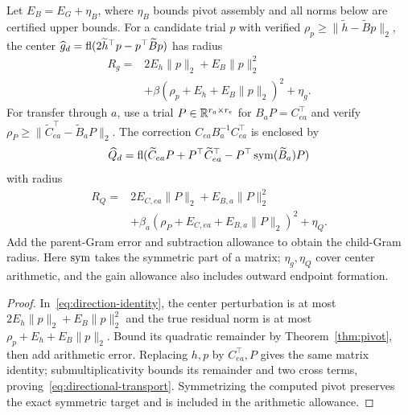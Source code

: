 \begin{theorem}\label{thm:directional}
Let $E_B=E_G+\eta_B$, where $\eta_B$ bounds pivot assembly and all norms below are certified upper bounds. For a candidate trial $p$ with verified $\rho_p\ge\|\widetilde h-\widetilde Bp\|_2$, the center $\widehat g_d=\operatorname{fl}(2\widetilde h^\top p-p^\top\widetilde Bp)$ has radius
\begin{equation}
 \begin{aligned}
 R_g={}&2E_h\|p\|_2+E_B\|p\|_2^2\\
 &+\beta(\rho_p+E_h+E_B\|p\|_2)^2+\eta_g.
 \end{aligned}
 \label{eq:directional-score}
\end{equation}
For transfer through $a$, use a trial $P\in\mathbb R^{r_a\times r_e}$ for $B_aP=C_{ea}^\top$ and verify $\rho_P\ge\|\widetilde C_{ea}^\top-\widetilde B_aP\|_2$. The correction $C_{ea}B_a^{-1}C_{ea}^\top$ is enclosed by
\begin{equation}
 \widehat Q_d=\operatorname{fl}(\widetilde C_{ea}P+P^\top\widetilde C_{ea}^\top
                         -P^\top\operatorname{sym}(\widetilde B_a)P)
 \label{eq:directional-center}
\end{equation}
with radius
\begin{equation}
 \begin{aligned}
 R_Q={}&2E_{C,ea}\|P\|_2+E_{B,a}\|P\|_2^2\\
 &+\beta_a(\rho_P+E_{C,ea}+E_{B,a}\|P\|_2)^2+\eta_Q.
 \end{aligned}
 \label{eq:directional-transport}
\end{equation}
Add the parent-Gram error and subtraction allowance to obtain the child-Gram radius. Here $\operatorname{sym}$ takes the symmetric part of a matrix; $\eta_g,\eta_Q$ cover center arithmetic, and the gain allowance also includes outward endpoint formation.
\end{theorem}
\begin{proof}
In~\eqref{eq:direction-identity}, the center perturbation is at most $2E_h\|p\|_2+E_B\|p\|_2^2$ and the true residual norm is at most $\rho_p+E_h+E_B\|p\|_2$. Bound its quadratic remainder by Theorem~\ref{thm:pivot}, then add arithmetic error. Replacing $h,p$ by $C_{ea}^\top,P$ gives the same matrix identity; submultiplicativity bounds its remainder and two cross terms, proving~\eqref{eq:directional-transport}. Symmetrizing the computed pivot preserves the exact symmetric target and is included in the arithmetic allowance.
\end{proof}

